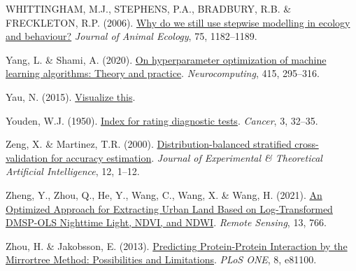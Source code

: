 \documentclass[
  letterpaper,
]{scrbook}
\newlength{\cslhangindent}
\newenvironment{CSLReferences}[2] %
 {\begin{list}{}{%
  \setlength{\itemindent}{0pt}
  \setlength{\leftmargin}{0pt}
  \setlength{\parsep}{0pt}
  \ifodd #1
   \setlength{\leftmargin}{\cslhangindent}
   \setlength{\itemindent}{-1\cslhangindent}
  \fi
  \setlength{\itemsep}{#2\baselineskip}}}
 {\end{list}}
\begin{document}
\begin{CSLReferences}{1}{0}
WHITTINGHAM, M.J., STEPHENS, P.A., BRADBURY, R.B. \& FRECKLETON, R.P.
(2006). \href{https://doi.org/10.1111/j.1365-2656.2006.01141.x}{Why do
we still use stepwise modelling in ecology and behaviour?} \emph{Journal
of Animal Ecology}, 75, 1182--1189.

Yang, L. \& Shami, A. (2020).
\href{https://doi.org/10.1016/j.neucom.2020.07.061}{On hyperparameter
optimization of machine learning algorithms: Theory and practice}.
\emph{Neurocomputing}, 415, 295--316.

Yau, N. (2015). \href{https://doi.org/10.1002/9781118722213}{Visualize
this}.

Youden, W.J. (1950).
\href{https://doi.org/10.1002/1097-0142(1950)3:1\%3C32::aid-cncr2820030106\%3E3.0.co;2-3}{Index
for rating diagnostic tests}. \emph{Cancer}, 3, 32--35.

Zeng, X. \& Martinez, T.R. (2000).
\href{https://doi.org/10.1080/095281300146272}{Distribution-balanced
stratified cross-validation for accuracy estimation}. \emph{Journal of
Experimental \& Theoretical Artificial Intelligence}, 12, 1--12.

Zheng, Y., Zhou, Q., He, Y., Wang, C., Wang, X. \& Wang, H. (2021).
\href{https://doi.org/10.3390/rs13040766}{An Optimized Approach for
Extracting Urban Land Based on Log-Transformed DMSP-OLS Nighttime Light,
NDVI, and NDWI}. \emph{Remote Sensing}, 13, 766.

Zhou, H. \& Jakobsson, E. (2013).
\href{https://doi.org/10.1371/journal.pone.0081100}{Predicting
Protein-Protein Interaction by the Mirrortree Method: Possibilities and
Limitations}. \emph{PLoS ONE}, 8, e81100.

\end{CSLReferences}


\backmatter
\end{document}
